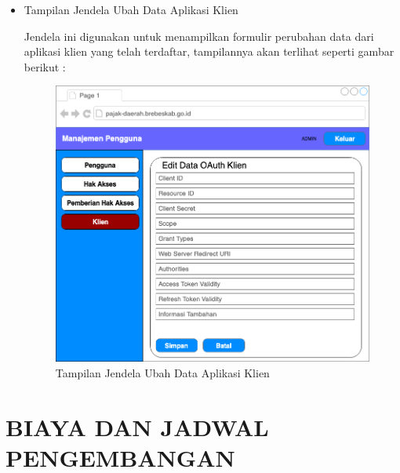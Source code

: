 \documentclass[pdftex,12pt, oneside]{article}
\begin{document}
\begin{itemize}
	\item Tampilan Jendela Ubah Data Aplikasi Klien
	
	Jendela ini digunakan untuk menampilkan formulir perubahan data dari aplikasi klien yang telah terdaftar, tampilannya akan terlihat seperti gambar berikut :
	
	\begin{figure}[H]
		\centering
		\includegraphics[width=1\textwidth]{./resources/edit-client-ui}
		\caption{Tampilan Jendela Ubah Data Aplikasi Klien}
		\label{fig:edit-client-ui}
	\end{figure}
	
\end{itemize}

\section{BIAYA DAN JADWAL PENGEMBANGAN}
\end{document}

